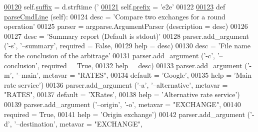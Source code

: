 \begin{DoxyCode}
\hypertarget{e2e_8py_source.tex_l00120}{}\hyperlink{classe2e_1_1_application_a4d824ad36b051d2d629edb314385df0d}{00120}         self.\hyperlink{classe2e_1_1_application_a4d824ad36b051d2d629edb314385df0d}{suffix} = d.strftime (\textcolor{stringliteral}{'%
\hypertarget{e2e_8py_source.tex_l00121}{}\hyperlink{classe2e_1_1_application_a027ff25e5409ae17584978a09fc2611a}{00121}         self.\hyperlink{classe2e_1_1_application_a027ff25e5409ae17584978a09fc2611a}{prefix} = \textcolor{stringliteral}{'e2e'}
00122     
\hypertarget{e2e_8py_source.tex_l00123}{}\hyperlink{classe2e_1_1_application_a91b8b6df6456d27bed503849ffcdcc77}{00123}     \textcolor{keyword}{def }\hyperlink{classe2e_1_1_application_a91b8b6df6456d27bed503849ffcdcc77}{parseCmdLine} (self):
00124         desc = \textcolor{stringliteral}{'Compare two exchanges for a round operation'}
00125         parser = argparse.ArgumentParser (description = desc)
00126         
00127         desc = \textcolor{stringliteral}{'Summary report (Default is stdout)'} 
00128         parser.add\_argument (\textcolor{stringliteral}{'-s'}, \textcolor{stringliteral}{'--summary'}, required = \textcolor{keyword}{False},
00129                              help = desc)
00130         desc = \textcolor{stringliteral}{'File name for the conclusion of the arbitrage'}
00131         parser.add\_argument (\textcolor{stringliteral}{'-c'}, \textcolor{stringliteral}{'--conclusion'}, required = \textcolor{keyword}{True},
00132                              help = desc)
00133         parser.add\_argument (\textcolor{stringliteral}{'-m'}, \textcolor{stringliteral}{'--main'}, metavar = \textcolor{stringliteral}{"RATES"}, 
00134                              default = \textcolor{stringliteral}{'Google'},
00135                              help = \textcolor{stringliteral}{'Main rate service'})
00136         parser.add\_argument (\textcolor{stringliteral}{'-a'}, \textcolor{stringliteral}{'--alternative'}, metavar = \textcolor{stringliteral}{"RATES"},
00137                              default = \textcolor{stringliteral}{'XRates'},
00138                              help = \textcolor{stringliteral}{'Alternative rate service'})
00139         parser.add\_argument (\textcolor{stringliteral}{'--origin'}, \textcolor{stringliteral}{'-o'}, metavar = \textcolor{stringliteral}{"EXCHANGE"},
00140                              required = \textcolor{keyword}{True},
00141                              help = \textcolor{stringliteral}{'Origin exchange'})
00142         parser.add\_argument (\textcolor{stringliteral}{'-d'}, \textcolor{stringliteral}{'--destination'}, metavar = \textcolor{stringliteral}{"EXCHANGE"},
}
\end{DoxyCode}
